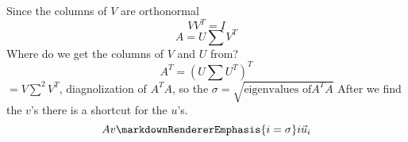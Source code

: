 \markdownRendererInterblockSeparator
{}Since the columns of $V$ are orthonormal\markdownRendererEllipsis{}\markdownRendererInterblockSeparator
{}$$VV^T=I$$\markdownRendererInterblockSeparator
{}$$A = U\sum V^T$$\markdownRendererInterblockSeparator
{}Where do we get the columns of $V$ and $U$ from?\markdownRendererInterblockSeparator
{}$$A^T = (U\sum U^T)^T$$\markdownRendererInterblockSeparator
{}$=V\sum^2 V^T$, diagnolization of $A^TA$, so the $\sigma=\sqrt{\text{eigenvalues of}A^TA}$\markdownRendererInterblockSeparator
{}After we find the $v$'s there is a shortcut for the $u$'s.\markdownRendererInterblockSeparator
{}$$Av\markdownRendererEmphasis{i=\sigma}i\vec{u}_i$$\relax